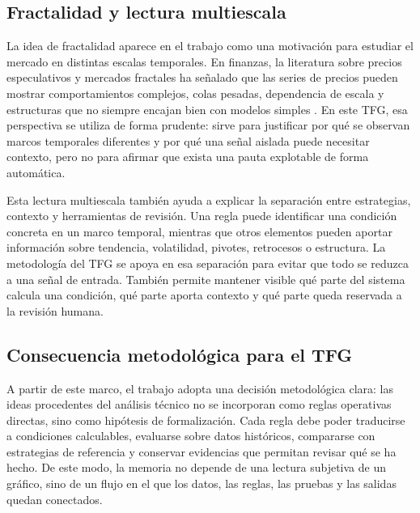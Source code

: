 \subsection{Fractalidad y lectura multiescala}
\label{subsec:fractalidad-multiescala}

La idea de fractalidad aparece en el trabajo como una motivaci\'on para estudiar
el mercado en distintas escalas temporales. En finanzas, la literatura sobre
precios especulativos y mercados fractales ha se\~nalado que las series de
precios pueden mostrar comportamientos complejos, colas pesadas, dependencia de
escala y estructuras que no siempre encajan bien con modelos simples
\cite{mandelbrot_1963_speculative_prices,
mandelbrot_hudson_2004_misbehavior,peters_1994_fractal_market}. En este TFG,
esa perspectiva se utiliza de forma prudente: sirve para justificar por qu\'e se
observan marcos temporales diferentes y por qu\'e una se\~nal aislada puede necesitar
contexto, pero no para afirmar que exista una pauta explotable de forma
autom\'atica.

Esta lectura multiescala tambi\'en ayuda a explicar la separaci\'on entre
estrategias, contexto y herramientas de revisi\'on. Una regla puede identificar una
condici\'on concreta en un marco temporal, mientras que otros elementos pueden
aportar informaci\'on sobre tendencia, volatilidad, pivotes, retrocesos o
estructura. La metodolog\'ia del TFG se apoya en esa separaci\'on para evitar que
todo se reduzca a una se\~nal de entrada. Tambi\'en permite mantener visible qu\'e
parte del sistema calcula una condici\'on, qu\'e parte aporta contexto y qu\'e parte
queda reservada a la revisi\'on humana.

\subsection{Consecuencia metodol\'ogica para el TFG}
\label{subsec:consecuencia-metodologica}

A partir de este marco, el trabajo adopta una decisi\'on metodol\'ogica clara:
las ideas procedentes del an\'alisis t\'ecnico no se incorporan como reglas
operativas directas, sino como hip\'otesis de formalizaci\'on. Cada regla debe
poder traducirse a condiciones calculables, evaluarse sobre datos hist\'oricos,
compararse con estrategias de referencia y conservar evidencias que permitan
revisar qu\'e se ha hecho. De este modo, la memoria no depende de una lectura
subjetiva de un gr\'afico, sino de un flujo en el que los datos, las reglas, las
pruebas y las salidas quedan conectados.

